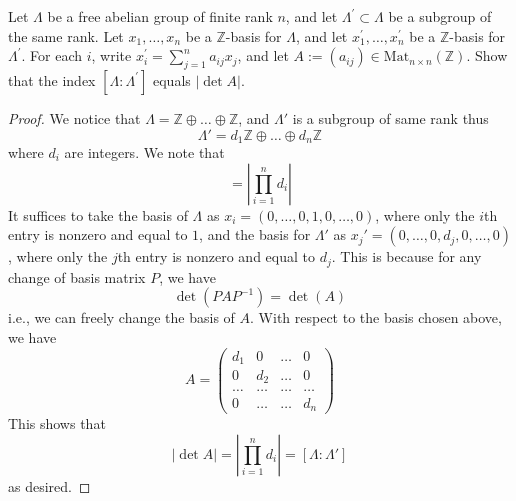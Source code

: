 \documentclass[openany]{book}
\newcommand{\Z}{\mathbb{Z}}
\begin{document}
\begin{prob}
    Let \(\Lambda\) be a free abelian group of finite rank \(n\), and let \(\Lambda^{\prime}\subset\Lambda\) be a subgroup of the same rank. Let \(x_{1},\ldots,x_{n}\) be a \(\mathbb{Z}\)-basis for \(\Lambda\), and let \(x^{\prime}_{1},\ldots,x^{\prime}_{n}\) be a \(\mathbb{Z}\)-basis for \(\Lambda^{\prime}\). For each \(i\), write \(x^{\prime}_{i}=\sum_{j=1}^{n}a_{ij}x_{j}\), and let \(A:=(a_{ij})\in \text{Mat}_{n\times n}(\mathbb{Z})\). Show that the index \([\Lambda:\Lambda^{\prime}]\) equals \(|\det A|\).
\end{prob}
\begin{proof}
    We notice that $\Lambda=\Z\oplus\dots\oplus\Z$, and $\Lambda'$ is a subgroup of same rank thus 
    \begin{equation*}
        \Lambda'=d_1\Z\oplus\dots\oplus d_n\Z
    \end{equation*}
    where $d_i$ are integers. We note that 
    \begin{equation*}
        [\Lambda:\Lambda']=\left|\prod_{i=1}^nd_i\right|
    \end{equation*}
    It suffices to take the basis of $\Lambda$ as $x_i=(0,\dots,0,1,0,\dots,0)$, where only the $i$th entry is nonzero and equal to $1$, and the basis for $\Lambda'$ as $x_j'=(0,\dots, 0,d_j,0,\dots, 0)$, where only the $j$th entry is nonzero and equal to $d_j$. This is because for any change of basis matrix $P$, we have 
    \begin{equation*}
        \det(PAP^{-1})=\det(A)
    \end{equation*} 
    i.e., we can freely change the basis of $A$. With respect to the basis chosen above, we have 
    \begin{equation*}
        A=\begin{pmatrix}
            d_1&0&\dots&0\\
            0&d_2&\dots&0\\
            \dots&\dots&\dots&\dots\\
            0&\dots&\dots&d_n
        \end{pmatrix}
    \end{equation*}
    This shows that 
    \begin{equation*}
        \left|\det A\right|=\left|\prod_{i=1}^nd_i\right|=[\Lambda:\Lambda']
    \end{equation*}
    as desired.
\end{proof}
\end{document}

